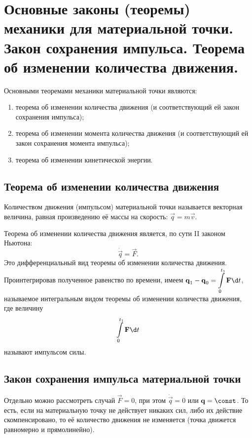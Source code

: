 \chapter{Основные законы (теоремы) механики для материальной точки. Закон
сохранения импульса. Теорема об изменении количества движения.}

Основными теоремами механики материальной точки являются:
\begin{enumerate}
    \item теорема об изменении количества движения (и соответствующий ей закон
    сохранения импульса);
    \item теорема об изменении момента количества движения (и соответствующий ей
    закон сохранения момента импульса);
    \item теорема об изменении кинетической энергии.
\end{enumerate}

\section{Теорема об изменении количества движения}

Количеством движения (импульсом) материальной точки
называется векторная величина, равная произведению её массы на скорость:
\( \vec{q} = m\vec{v} \).

Теорема об изменении количества движения является, по сути II законом Ньютона:
\[
    \dot{\vec{q}} = \vec{F}.
\]
Это дифференциальный вид теоремы об изменении количества движения.
Проинтегрировав полученное равенство по времени, имеем \( \ds \vec{q}_1 -
\vec{q}_0 = \int\limits_0^{t_1} \vec{F}\d t \), называемое интегральным видом
теоремы об изменении количества движения, где величину
\[
    \int\limits_0^{t_1} \vec{F}\d t
\]
называют импульсом силы.

\section{Закон сохранения импульса материальной точки}

Отдельно можно рассмотреть случай \( \vec{F} = 0 \), при этом \( \dot{\vec{q}} =
0 \) или \( \vec{q} = \const \). То есть, если на материальную точку не
действует никаких сил, либо их действие скомпенсировано, то её количество
движения не изменяется (точка движется равномерно и прямолинейно).

\newpage %